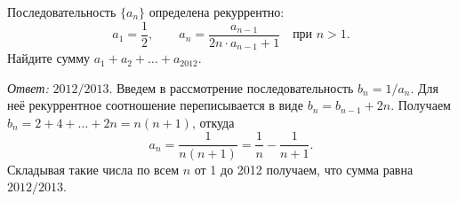 Последовательность $\{ a_n \}$ определена рекуррентно:
\[
    a_1 = \frac{1}{2}
,\qquad
    a_n = \frac{a_{n - 1}}{2 n \cdot a_{n - 1} + 1}
    \quad\text{при $n > 1$}
.\]
Найдите сумму $a_1 + a_2 + \ldots + a_{2012}$.

\solution
\label{solution:2012/regatta/senior/algbr/4}%
\emph{Ответ:} $2012 / 2013$.
Введем в рассмотрение последовательность $b_n = 1 / a_n$.
Для неё рекуррентное соотношение переписывается в виде $b_n = b_{n - 1} + 2 n$.
Получаем
$b_n = 2 + 4 + \ldots + 2 n = n (n + 1)$,
откуда
\[a_n = \frac{1}{n (n + 1)} = \frac{1}{n} - \frac{1}{n + 1}.\]
Складывая такие числа по всем $n$ от 1 до 2012 получаем, что сумма равна
$2012 / 2013$.


